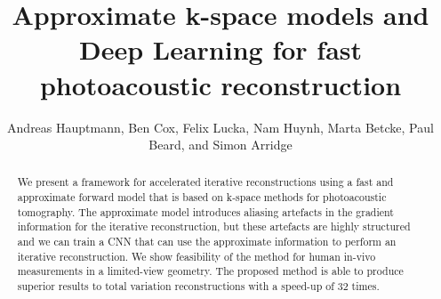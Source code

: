 \documentclass[runningheads]{llncs}
\begin{document}
%

\title{Approximate k-space models and Deep Learning for fast photoacoustic reconstruction}


\author{Andreas Hauptmann, Ben Cox, Felix Lucka, Nam Huynh, Marta Betcke, Paul Beard, and Simon Arridge}




\maketitle
\vspace{-0.5em}
\begin{abstract}
We present a framework for accelerated iterative reconstructions using a fast and approximate forward model that is based on k-space methods for photoacoustic tomography. The approximate model introduces aliasing artefacts in the gradient information for the iterative reconstruction, but these artefacts are highly structured and we can train a CNN that can use the approximate information to perform an iterative reconstruction. We show feasibility of the method for human in-vivo measurements in a limited-view geometry. The proposed method is able to produce superior results to total variation reconstructions with a speed-up of 32 times.
\end{abstract}
\end{document}
